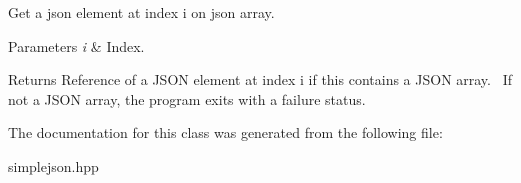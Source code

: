 Get a json element at index i on json array. 


\begin{DoxyParams}{Parameters}
{\em i} & Index.\\
\hline
\end{DoxyParams}
\begin{DoxyReturn}{Returns}
Reference of a J\+S\+O\+N element at index i if this contains a J\+S\+O\+N array.~\newline
 If not a J\+S\+O\+N array, the program exits with a failure status. 
\end{DoxyReturn}


The documentation for this class was generated from the following file\+:\begin{DoxyCompactItemize}
\item 
simplejson.\+hpp\end{DoxyCompactItemize}
